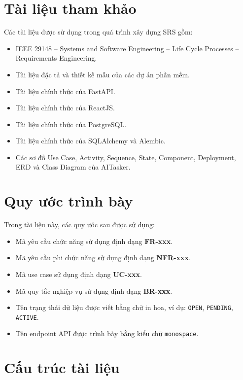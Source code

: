 \section{Tài liệu tham khảo}
\label{sec:references}

Các tài liệu được sử dụng trong quá trình xây dựng SRS gồm:

\begin{itemize}
    \item IEEE 29148 -- Systems and Software Engineering -- Life Cycle Processes -- Requirements Engineering.
    \item Tài liệu đặc tả và thiết kế mẫu của các dự án phần mềm.
    \item Tài liệu chính thức của FastAPI.
    \item Tài liệu chính thức của ReactJS.
    \item Tài liệu chính thức của PostgreSQL.
    \item Tài liệu chính thức của SQLAlchemy và Alembic.
    \item Các sơ đồ Use Case, Activity, Sequence, State, Component, Deployment, ERD và Class Diagram của AITasker.
\end{itemize}

\section{Quy ước trình bày}
\label{sec:document-conventions}

Trong tài liệu này, các quy ước sau được sử dụng:

\begin{itemize}
    \item Mã yêu cầu chức năng sử dụng định dạng \textbf{FR-xxx}.
    \item Mã yêu cầu phi chức năng sử dụng định dạng \textbf{NFR-xxx}.
    \item Mã use case sử dụng định dạng \textbf{UC-xxx}.
    \item Mã quy tắc nghiệp vụ sử dụng định dạng \textbf{BR-xxx}.
    \item Tên trạng thái dữ liệu được viết bằng chữ in hoa, ví dụ: \texttt{OPEN}, \texttt{PENDING}, \texttt{ACTIVE}.
    \item Tên endpoint API được trình bày bằng kiểu chữ \texttt{monospace}.
\end{itemize}

\section{Cấu trúc tài liệu}
\label{sec:document-structure}

